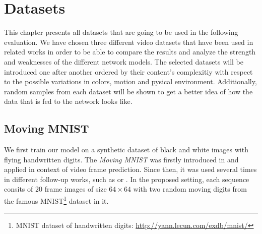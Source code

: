 




\chapter{Datasets} \label{chapter:datasets}

This chapter presents all datasets that are going to be used in the following evaluation. We have chosen three different video datasets that have been used in related works in order to be able to compare the results and analyze the strength and weaknesses of the different network models. The selected datasets will be introduced one after another ordered by their content's complexitiy with respect to the possible variations in colors, motion and pysical environment. Additionally, random samples from each dataset will be shown to get a better idea of how the data that is fed to the network looks like.


\section{Moving MNIST}


We first train our model on a synthetic dataset of black and white images with flying handwritten digits. The \textit{Moving MNIST} was firstly introduced in \parencite{unsup_learn_lstm} and applied in context of video frame prediction. Since then, it was used several times in different follow-up works, such as \parencite{spat_temp_video_autoenc} or \parencite{conv_lstm_nowcasting}. In the proposed setting, each sequence consits of $20$ frame images of size $ 64 \times 64 $ with two random moving digits from the famous MNIST\footnote{MNIST dataset of handwritten digits: \url{http://yann.lecun.com/exdb/mnist/}} dataset in it. 

